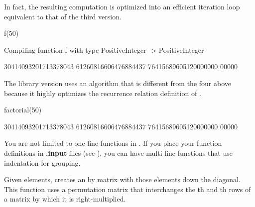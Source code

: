 {{{{{{{{\begin{xtc}
\begin{xtccomment}
In fact, the resulting computation is optimized into an efficient
iteration loop equivalent to that of the third version.
\end{xtccomment}
\begin{spadsrc}
f(50) 
\end{spadsrc}
\begin{MessageOutput}
   Compiling function f with type PositiveInteger -> PositiveInteger 
\end{MessageOutput}
\begin{TeXOutput}
\begin{fricasmath}{9}
30414093201713378043 61260816606476884437 76415689605120000000 00000%
\end{fricasmath}
\end{TeXOutput}
\end{xtc}
\begin{xtc}
\begin{xtccomment}
The library version uses an algorithm that is different from the four
above because it highly optimizes the recurrence relation definition of
.
\end{xtccomment}
\begin{spadsrc}
factorial(50)
\end{spadsrc}
\begin{TeXOutput}
\begin{fricasmath}{10}
30414093201713378043 61260816606476884437 76415689605120000000 00000%
\end{fricasmath}
\end{TeXOutput}
\end{xtc}

You are not limited to one-line functions in \Language{}.
If you place your function definitions in {\bf .input} files
(see ), you can have
multi-line functions that use indentation for grouping.

Given  elements,  creates an
 by  matrix with those elements down the diagonal.
This function uses a permutation matrix
that interchanges the th and th rows of a matrix
by which it is right-multiplied.

}}}}}}}}
